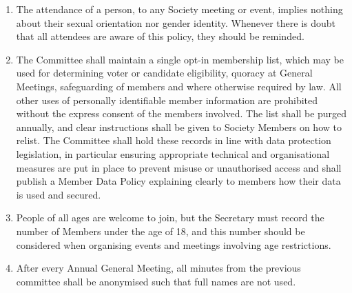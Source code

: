 \documentclass[12pt]{constitution}
\begin{document}
\begin{enumerate}
    \item The attendance of a person, to any Society meeting or event, implies nothing about their sexual orientation nor gender identity. Whenever there is doubt that all attendees are aware of this policy, they should be reminded.
    \item The Committee shall maintain a single opt-in membership list, which may be used for determining voter or candidate eligibility, quoracy at General Meetings, safeguarding of members and where otherwise required by law. All other uses of personally identifiable member information are prohibited without the express consent of the members involved. The list shall be purged annually, and clear instructions shall be given to Society Members on how to relist. The Committee shall hold these records in line with data protection legislation, in particular ensuring appropriate technical and organisational measures are put in place to prevent misuse or unauthorised access and shall publish a Member Data Policy explaining clearly to members how their data is used and secured.
    \item People of all ages are welcome to join, but the Secretary must record the number of Members under the age of 18, and this number should be considered when organising events and meetings involving age restrictions.
    \item After every Annual General Meeting, all minutes from the previous committee shall be anonymised such that full names are not used.
\end{enumerate}


\label{article:officers-committee}
\end{document}

